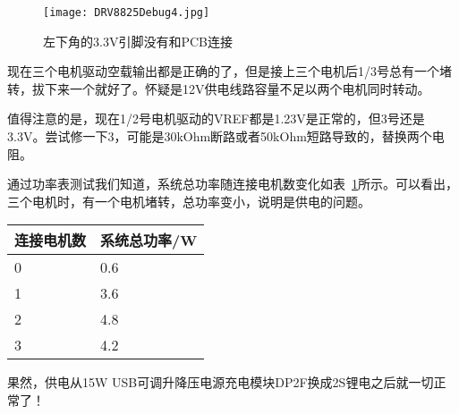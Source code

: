 \begin{figure}[htbp]
    \centering
    \texttt{[image: DRV8825Debug4.jpg]}
    \caption{左下角的3.3V引脚没有和PCB连接}
    \label{fig:DRV8825Debug4}
\end{figure}

现在三个电机驱动空载输出都是正确的了，但是接上三个电机后1/3号总有一个堵转，拔下来一个就好了。怀疑是12V供电线路容量不足以两个电机同时转动。

值得注意的是，现在1/2号电机驱动的VREF都是1.23V是正常的，但3号还是3.3V。尝试修一下3，可能是30kOhm断路或者50kOhm短路导致的，替换两个电阻。

通过功率表测试我们知道，系统总功率随连接电机数变化如表~\ref{tab:DRV8825Debug}所示。可以看出，三个电机时，有一个电机堵转，总功率变小，说明是供电的问题。

\begin{table}
    \centering
    \begin{tabular}{ll} 
    \toprule
    连接电机数 & 系统总功率/W  \\
    \hline
    0     & 0.6      \\
    1     & 3.6      \\
    2     & 4.8      \\
    3     & 4.2      \\
    \bottomrule
    \end{tabular}
    \label{tab:DRV8825Debug}
\end{table}

果然，供电从15W USB可调升降压电源充电模块DP2F换成2S锂电之后就一切正常了！